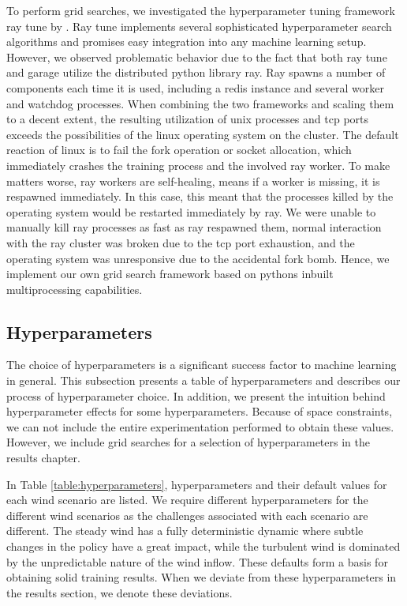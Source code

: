 To perform grid searches, we investigated the hyperparameter tuning framework ray tune by \citet{liawTuneResearchPlatform2018}. Ray tune implements several sophisticated hyperparameter search algorithms and promises easy integration into any machine learning setup. However, we observed problematic behavior due to the fact that both ray tune and garage utilize the distributed python library ray. Ray spawns a number of components each time it is used, including a redis instance and several worker and watchdog processes. When combining the two frameworks and scaling them to a decent extent, the resulting utilization of unix processes and tcp ports exceeds the possibilities of the linux operating system on the cluster. The default reaction of linux is to fail the fork operation or socket allocation, which immediately crashes the training process and the involved ray worker. To make matters worse, ray workers are self-healing, means if a worker is missing, it is respawned immediately. In this case, this meant that the processes killed by the operating system would be restarted immediately by ray. We were unable to manually kill ray processes as fast as ray respawned them, normal interaction with the ray cluster was broken due to the tcp port exhaustion, and the operating system was unresponsive due to the accidental fork bomb. Hence, we implement our own grid search framework based on pythons inbuilt multiprocessing capabilities.
  

\subsection{Hyperparameters}
\label{section:approach-hyperparameters}

\begin{summary}
The choice of hyperparameters is a significant success factor to machine learning in general. This subsection presents a table of hyperparameters and describes our process of hyperparameter choice. In addition, we present the intuition behind hyperparameter effects for some hyperparameters. Because of space constraints, we can not include the entire experimentation performed to obtain these values. However, we include grid searches for a selection of hyperparameters in the results chapter.
\end{summary}

In Table \ref{table:hyperparameters}, hyperparameters and their default values for each wind scenario are listed. We require different hyperparameters for the different wind scenarios as the challenges associated with each scenario are different. The steady wind has a fully deterministic dynamic where subtle changes in the policy have a great impact, while the turbulent wind is dominated by the unpredictable nature of the wind inflow. These defaults form a basis for obtaining solid training results. When we deviate from these hyperparameters in the results section, we denote these deviations.


